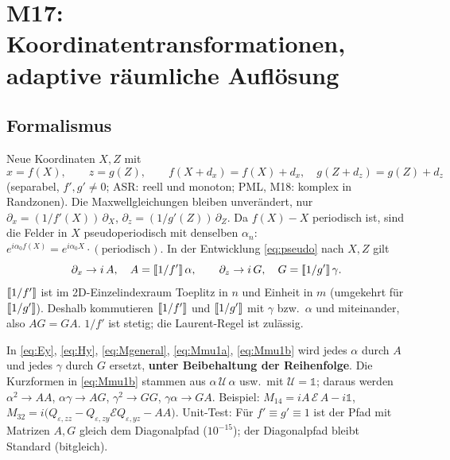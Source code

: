 \section{M17: Koordinatentransformationen, adaptive räumliche Auflösung}\label{sec:ctrans}

\subsection{Formalismus}
Neue Koordinaten $X,Z$ mit
\begin{equation}
  x=f(X),\qquad z=g(Z),\qquad f(X+d_x)=f(X)+d_x,\quad g(Z+d_z)=g(Z)+d_z
  \label{eq:ct_map}
\end{equation}
(separabel, $f',g'\neq0$; ASR: reell und monoton; PML, M18: komplex in Randzonen). Die Maxwellgleichungen bleiben
unverändert, nur $\partial_x=(1/f'(X))\,\partial_X$, $\partial_z=(1/g'(Z))\,\partial_Z$. Da $f(X)-X$ periodisch ist, sind
die Felder in $X$ pseudoperiodisch mit denselben $\alpha_n$:
$e^{i\alpha_0f(X)}=e^{i\alpha_0X}\cdot(\text{periodisch})$. In der Entwicklung \eqref{eq:pseudo} nach $X,Z$ gilt
\begin{equation}
  \partial_x\to i\,A,\quad A=[\![1/f']\!]\,\alpha,\qquad \partial_z\to i\,G,\quad G=[\![1/g']\!]\,\gamma .
  \label{eq:ct_deriv}
\end{equation}
$[\![1/f']\!]$ ist im 2D-Einzelindexraum Toeplitz in $n$ und Einheit in $m$ (umgekehrt für $[\![1/g']\!]$). Deshalb
kommutieren $[\![1/f']\!]$ und $[\![1/g']\!]$ mit $\gamma$ bzw.\ $\alpha$ und miteinander, also $AG=GA$. $1/f'$ ist stetig;
die Laurent-Regel ist zulässig.

\begin{tcolorbox}[title=Ersetzungsregel]
In \eqref{eq:Ey}, \eqref{eq:Hy}, \eqref{eq:Mgeneral}, \eqref{eq:Mmu1a}, \eqref{eq:Mmu1b} wird jedes $\alpha$ durch $A$ und
jedes $\gamma$ durch $G$ ersetzt, \textbf{unter Beibehaltung der Reihenfolge}. Die Kurzformen in \eqref{eq:Mmu1b}
stammen aus $\alpha\,\mathcal U\,\alpha$ usw.\ mit $\mathcal U=\mathbb 1$; daraus werden
$\alpha^2\to AA$, $\alpha\gamma\to AG$, $\gamma^2\to GG$, $\gamma\alpha\to GA$. Beispiel:
$M_{14}=iA\,\mathcal E\,A-i\mathbb 1$, $M_{32}=i\big(Q_{\varepsilon,zz}-Q_{\varepsilon,zy}\mathcal EQ_{\varepsilon,yz}-AA\big)$.
Unit-Test: Für $f'\equiv g'\equiv1$ ist der Pfad mit Matrizen $A,G$ gleich dem Diagonalpfad ($10^{-15}$);
der Diagonalpfad bleibt Standard (bitgleich).
\end{tcolorbox}

